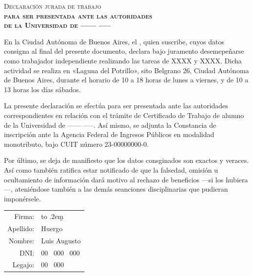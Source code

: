 \documentclass[a4paper,10pt]{article}
\author{Apellido, nombre}
\makeatletter
\def\universidad{Universidad de ------ -----}
\def\ciudad{Ciudad Autónoma de Buenos Aires}
\def\apellido{Huergo}
\def\nombre{Luis Augusto}
\def\CUIT{23-00000000-0}
\def\DNI{00~ 000~ 000}
\def\tareas{las tareas de XXXX y XXXX}
\def\horario{de 10 a 18 horas de lunes a viernes, y de 10 a 13 horas los días sábados}
\def\lugar{«Laguna del Potrillo», sito Belgrano 26, \ciudad}
\def\legajo{00~ 000}
\def\fecha{\@date}
\def\dotsign{\xleaders\hbox to .2em{\d{}}\hfill\d{}}
\makeatother
\begin{document}
{\raggedright 
\begin{center}
{\Huge \textsc{Declaración jurada de trabajo} }\\[2ex]
{\LARGE \bfseries \sffamily \textsc{para ser presentada ante las autoridades}}\\[1ex]
{\LARGE \bfseries \sffamily \textsc{de la \universidad }}\\[4em]
\end{center}}

\noindent
En la \ciudad, el \fecha, quien suscribe, cuyos datos consigna al final del presente documento, declara bajo juramento desemepeñarse como trabajador independiente realizando \tareas. Dicha actividad se realiza en \lugar, durante el horario \horario.\par

La presente declaración se efectúa para ser presentada ante las autoridades correspondientes en relación con el trámite de Certificado de Trabajo de alumno de la \universidad. Así mismo, se adjunta la Constancia de inscripción ante la Agencia Federal de Ingresos Públicos en modalidad monotributo, bajo CUIT número \CUIT. \par

Por último, se deja de manifiesto que los datos consginados son exactos y veraces. Así como también ratifica estar notificado de que la falsedad, omisión u ocultamiento de información dará motivo al rechazo de beneficios —si los hubiera—, ateniéndose también a las demás seanciones disciplinarias que pudieran imponérsele.

\vspace{8em}

\begin{tabular}{r l}
Firma: &  \dotsign \\
Apellido: & \apellido \\
Nombre: & \nombre \\
DNI: & \DNI \\
Legajo: & \legajo \\

\end{tabular}
\end{document}
